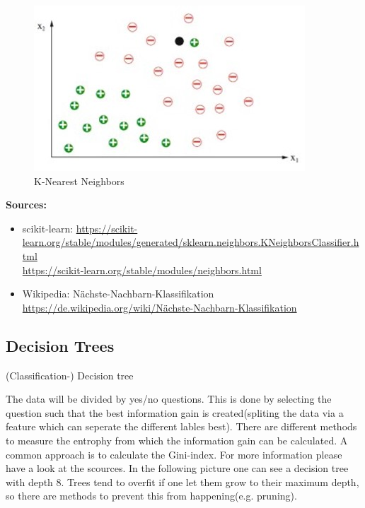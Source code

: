 \begin{figure}[hbtp]
	\centering
	\includegraphics[scale=0.8]{knn2}
	\caption{K-Nearest Neighbors}
	\label{fig:Datensatz - unbearbeitet}
\end{figure}
 
 
\textbf{Sources:}
\begin{itemize}
\item scikit-learn: \hyperlink{https://scikit-learn.org/stable/modules/generated/sklearn.neighbors.KNeighborsClassifier.html}{https://scikit-learn.org/stable/modules/generated/sklearn.neighbors.KNeighborsClassifier.html} \\
\hyperlink{https://scikit-learn.org/stable/modules/neighbors.html}{https://scikit-learn.org/stable/modules/neighbors.html}
\item Wikipedia: Nächste-Nachbarn-Klassifikation \hyperlink{https://de.wikipedia.org/wiki/Nächste-Nachbarn-Klassifikation}{https://de.wikipedia.org/wiki/Nächste-Nachbarn-Klassifikation}
\end{itemize} 

\subsection{Decision Trees}

(Classification-) Decision tree

The data will be divided by yes/no questions. This is done by selecting the question such that the best information gain is created(spliting the data via a feature which can seperate the different lables best). There are different methods to measure the entrophy from which the information gain can be calculated. A common approach is to calculate the Gini-index. For more information please have a look at the scources. In the following picture one can see a decision tree with depth 8. Trees tend to overfit if one let them grow to their maximum depth, so there are methods to prevent this from happening(e.g. pruning).

